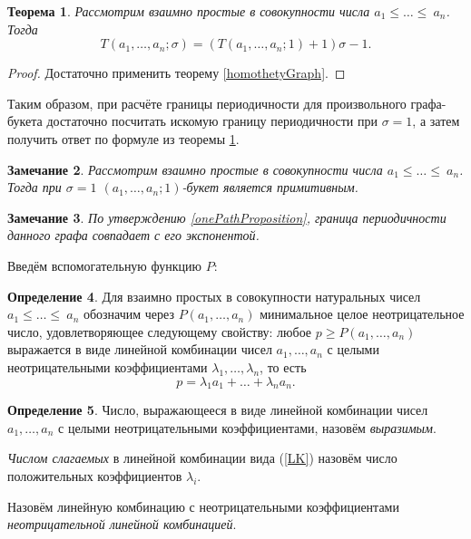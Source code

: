 \documentclass[12pt]{article}
\newtheorem{theorem}{Теорема}[section]
\newtheorem{remark}[theorem]{Замечание}
\theoremstyle{definition}
\newtheorem{definition}[theorem]{Определение}
\begin{document}
\begin{theorem}
\label{everyKFormula}
Рассмотрим взаимно простые в совокупности числа $a_1 \le \dots \le ~a_n$. Тогда
\begin{equation*}
T(a_1, \dots, a_n; \sigma) = (T(a_1, \dots, a_n; 1) + 1)\sigma - 1.
\end{equation*}
\end{theorem}
\begin{proof}
Достаточно применить теорему \ref{homothetyGraph}.
\end{proof}

Таким образом, при расчёте границы периодичности для произвольного графа-букета достаточно посчитать искомую границу периодичности при $\sigma = 1$, а затем получить ответ по формуле из теоремы \ref{everyKFormula}. 

\begin{remark}
Рассмотрим взаимно простые в совокупности числа $a_1 \le \dots \le ~a_n$. Тогда при $\sigma = 1$ $(a_1, \dots, a_n; 1)$-букет является примитивным.
\end{remark}

\begin{remark}
\label{rmrk:expAndT}
По утверждению \ref{onePathProposition}, граница периодичности данного графа совпадает с его экспонентой.
\end{remark}

Введём вспомогательную функцию $P$:

\begin{definition}
Для взаимно простых в совокупности натуральных чисел $a_1 \le \dots \le~a_n$ обозначим через $P(a_1, \dots, a_n)$ минимальное целое неотрицательное число, удовлетворяющее следующему свойству: любое $p \ge P(a_1, \dots, a_n)$ выражается в виде линейной комбинации чисел $a_1, \dots, a_n$ с целыми неотрицательными коэффициентами $\lambda_1, \dots, \lambda_n$, то есть
\begin{equation}
\label{LK}
p = \lambda_1 a_1 + \dots + \lambda_n a_n.
\end{equation}
\end{definition}

\begin{definition}
Число, выражающееся в виде линейной комбинации чисел $a_1, \dots, a_n$ с целыми неотрицательными коэффициентами, назовём \textit{выразимым}.

\textit{Числом слагаемых} в линейной комбинации вида (\ref{LK}) назовём число положительных коэффициентов $\lambda_i$.

Назовём линейную комбинацию с неотрицательными коэффициентами \textit{неотрицательной линейной комбинацией}.
\end{definition}
\end{document}
